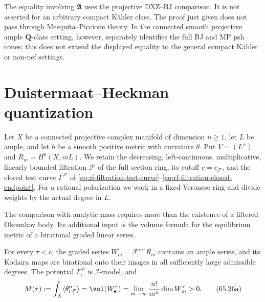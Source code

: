 \begin{remark}\label{rem:rf-vertical-equality-scope}
The equality involving $\mathfrak A$ uses the projective DXZ--BJ
comparison.
It is not asserted for an arbitrary compact K\"ahler class.
The proof just given does not pass through Mesquita--Piccione theory.  In the
connected smooth projective ample $\mathbf Q$-class setting, however,
 separately identifies the full BJ and
MP psh cones; this does not extend the displayed equality to the general
compact K\"ahler or non-nef settings.
\end{remark}

\section{Duistermaat--Heckman quantization}
\label{sec:rf-dh-quantization}

Let $X$ be a connected projective complex manifold of dimension $n\geq1$, let $L$ be ample, and let $h$ be a smooth positive metric with curvature $\theta$. Put $V=(L^n)$ and $R_m=H^0(X,mL)$. We retain the decreasing, left-continuous, multiplicative, linearly bounded filtration $\mathcal F$ of the full section ring, its cutoff $c=c_{\mathcal F}$, and the closed test curve $\Gamma^{\mathcal F}$ of \eqref{eq:rf-filtration-test-curve}--\eqref{eq:rf-filtration-closed-endpoint}. For a rational polarization we work in a fixed Veronese ring and divide weights by the actual degree in $L$.

The comparison with analytic mass requires more than the existence of a filtered Okounkov body. Its additional input is the volume formula for the equilibrium metric of a birational graded linear series.

\noindent\begin{minipage}{\linewidth}
\begin{lemma}\label{lem:rf-filtered-volume-mass}
For every $\tau<c$, the graded series $W^\tau_m=\mathcal F^{m\tau}R_m$ contains an ample series, and its Kodaira maps are birational onto their images in all sufficiently large admissible degrees. The potential $\Gamma^{\mathcal F}_\tau$ is $\mathcal I$-model, and
\[
 M(\tau):=\int_X\langle\theta_{\Gamma^{\mathcal F}_\tau}^n\rangle
   =\vol(W^\tau_\bullet)
   =\lim_{m\to\infty}\frac{n!}{m^n}\dim W^\tau_m>0.
 \tag{65.26a}\label{eq:rf-filtered-volume-mass}
\]
\end{lemma}
\end{minipage}\par

